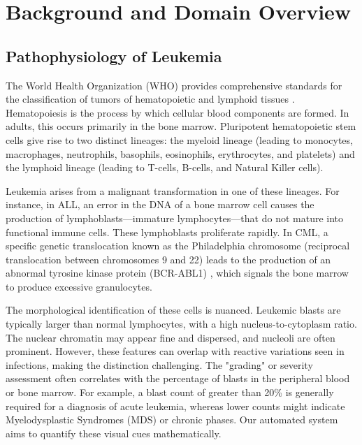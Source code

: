 \documentclass[12pt, a4paper]{article}
\begin{document}
\section{Background and Domain Overview}

\subsection{Pathophysiology of Leukemia}
The World Health Organization (WHO) provides comprehensive standards for the classification of tumors of hematopoietic and lymphoid tissues \cite{r2, r3, r10}. Hematopoiesis is the process by which cellular blood components are formed. In adults, this occurs primarily in the bone marrow. Pluripotent hematopoietic stem cells give rise to two distinct lineages: the myeloid lineage (leading to monocytes, macrophages, neutrophils, basophils, eosinophils, erythrocytes, and platelets) and the lymphoid lineage (leading to T-cells, B-cells, and Natural Killer cells).

Leukemia arises from a malignant transformation in one of these lineages. For instance, in ALL, an error in the DNA of a bone marrow cell causes the production of lymphoblasts—immature lymphocytes—that do not mature into functional immune cells. These lymphoblasts proliferate rapidly. In CML, a specific genetic translocation known as the Philadelphia chromosome (reciprocal translocation between chromosomes 9 and 22) leads to the production of an abnormal tyrosine kinase protein (BCR-ABL1) \cite{r12}, which signals the bone marrow to produce excessive granulocytes.

The morphological identification of these cells is nuanced. Leukemic blasts are typically larger than normal lymphocytes, with a high nucleus-to-cytoplasm ratio. The nuclear chromatin may appear fine and dispersed, and nucleoli are often prominent. However, these features can overlap with reactive variations seen in infections, making the distinction challenging. The "grading" or severity assessment often correlates with the percentage of blasts in the peripheral blood or bone marrow. For example, a blast count of greater than 20\% is generally required for a diagnosis of acute leukemia, whereas lower counts might indicate Myelodysplastic Syndromes (MDS) or chronic phases. Our automated system aims to quantify these visual cues mathematically.
\end{document}
